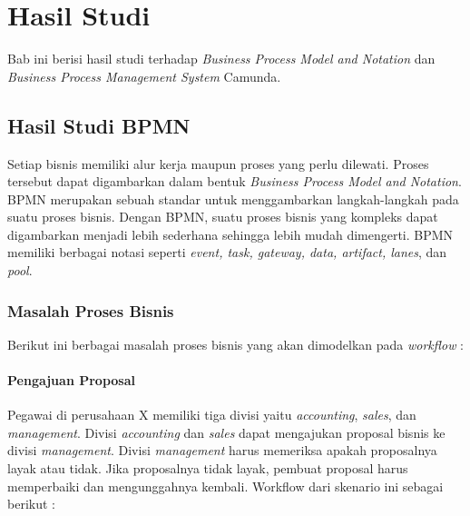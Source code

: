 \chapter{Hasil Studi}
\label{chap:hasilstudi}
Bab ini berisi hasil studi terhadap \textit{Business Process Model and Notation} dan \textit{Business Process Management System} Camunda. 

\section{Hasil Studi BPMN}
\label{sec:hasilstudi_bpmn}
Setiap bisnis memiliki alur kerja maupun proses yang perlu dilewati. Proses tersebut dapat digambarkan dalam bentuk \textit{Business Process Model and Notation}. BPMN merupakan sebuah standar untuk menggambarkan langkah-langkah pada suatu proses bisnis. Dengan BPMN, suatu proses bisnis yang kompleks dapat digambarkan menjadi lebih sederhana sehingga lebih mudah dimengerti. BPMN memiliki berbagai notasi seperti \textit{event, task, gateway, data, artifact, lanes}, dan \textit{pool}.  

	
\subsection{Masalah Proses Bisnis}
\label{hasilstudi_bpmn_masalah}
Berikut ini berbagai masalah proses bisnis yang akan dimodelkan pada \textit{workflow} :

\subsubsection{Pengajuan Proposal}
Pegawai di perusahaan X memiliki tiga divisi yaitu \textit{accounting}, \textit{sales}, dan \textit{management}. Divisi \textit{accounting} dan \textit{sales} dapat mengajukan proposal bisnis ke divisi \textit{management}. Divisi \textit{management} harus memeriksa apakah proposalnya layak atau tidak. Jika proposalnya tidak layak, pembuat proposal harus memperbaiki dan mengunggahnya kembali. Workflow dari skenario ini sebagai berikut :


